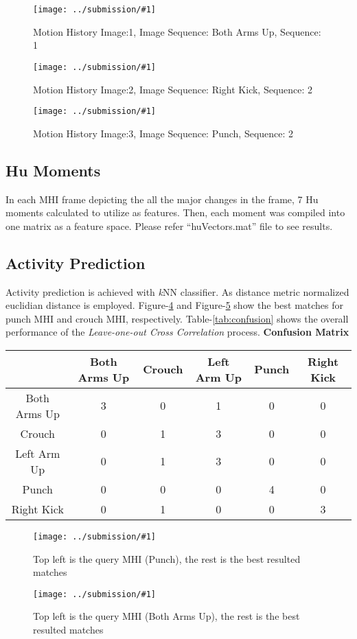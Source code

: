 \documentclass{article}
\newcommand{\listFigure}[3]{ \begin{figure}[H]
\texttt{[image: ../submission/\#1]}
		\caption{#2\label{fig:#3}} 
	\end{figure}		
}
\begin{document}
\listFigure{MHI-botharms-p1-1.png}{Motion History Image:1, Image Sequence:
Both Arms Up, Sequence:
1}{MHI-botharms-p1-1} 

\listFigure{MHI-rightkick-p1-2.png}{Motion History Image:2, Image Sequence:
Right Kick, Sequence:
2}{MHI-rightkick-p1-2} 

\listFigure{MHI-punch-p1-2.png}{Motion History Image:3, Image Sequence:
Punch, Sequence:
2}{MHI-punch-p1-2.png} 
\subsection{Hu Moments}
In each MHI frame depicting the all the major changes in the frame, 7 Hu moments
calculated to utilize as features. Then, each moment was compiled into one
matrix as a feature space. Please refer ``huVectors.mat'' file to see results.
\subsection{Activity Prediction}
Activity prediction is achieved with \textit{k}NN classifier. As distance
metric normalized euclidian distance is employed.
Figure-\ref{fig:matched-13-15punch-p2-1-k-3} and
Figure-\ref{fig:matched-2-3botharms-p2-1-k-3} show the best matches for punch
MHI and crouch MHI, respectively.
Table-\ref{tab:confusion} shows the overall performance of the
\textit{Leave-one-out Cross Correlation} process.
\newpage
\textbf{Confusion Matrix}
\begin{center}\label{tab:confusion}
	\begin{tabular}{ |c | c | c | c | c | c| }
	\hline
	  & Both Arms Up & Crouch & Left Arm Up & Punch & Right Kick \\ \hline
	  Both Arms Up & 3 & 0 & 1 & 0 & 0 \\ \hline
	  Crouch & 0 & 1 & 3 & 0 & 0 \\ \hline
	  Left Arm Up & 0 & 1 & 3 & 0 & 0 \\ \hline
	  Punch & 0 & 0 & 0 & 4 & 0 \\ \hline
	  Right Kick & 0 & 1 & 0 & 0 & 3 \\
	\hline
	\end{tabular}
\end{center}
\listFigure{matched-13-15punch-p2-1-k-3.png}{Top
left is the query MHI (Punch), the rest is the best
resulted matches}{matched-13-15punch-p2-1-k-3}
\listFigure{matched-2-3botharms-p2-1-k-3.png}{Top
left is the query MHI (Both Arms Up), the rest is the best
resulted matches}{matched-2-3botharms-p2-1-k-3}
\end{document}
